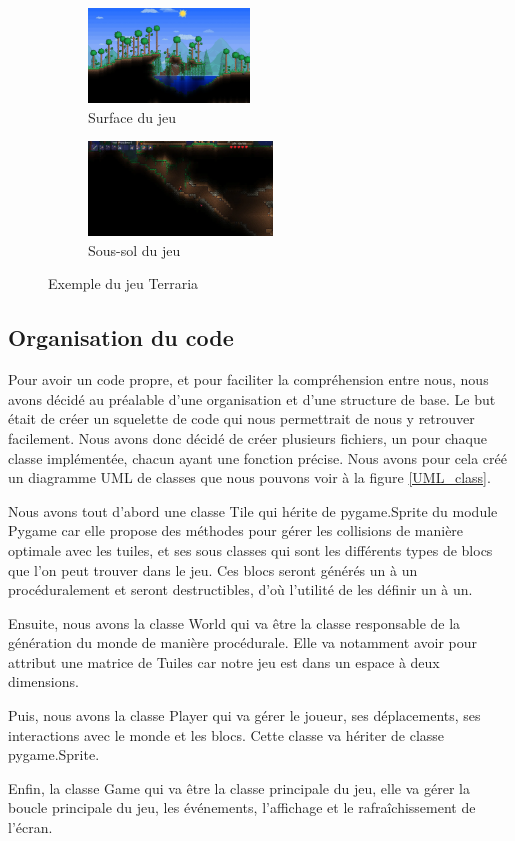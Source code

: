 \documentclass[12pt]{article}
\begin{document}
\begin{figure}[!h]
  \centering
  \begin{subfigure}[b]{0.4\textwidth}
    \centering
    \includegraphics[height=95px]{assets/terraria_forest_biome.jpg}
    \caption{Surface du jeu}
    \label{surface}
  \end{subfigure}
  \hspace{1cm}
  \begin{subfigure}[b]{0.4\textwidth}
    \centering
    \includegraphics[height=95px]{assets/terraria_cavern.png}
    \caption{Sous-sol du jeu}
    \label{cavern}
  \end{subfigure}
  \caption{Exemple du jeu Terraria}
  \label{ImageJeu}
\end{figure}
\vspace{1cm}
\subsection{Organisation du code}

Pour avoir un code propre, et pour faciliter la compréhension entre nous, nous avons décidé au préalable d'une organisation et d'une structure de base. Le but était de créer un squelette de code qui nous permettrait de nous y retrouver facilement. Nous avons donc décidé de créer plusieurs fichiers, un pour chaque classe implémentée, chacun ayant une fonction précise. Nous avons pour cela créé un diagramme UML de classes que nous pouvons voir à la figure \ref{UML_class}.\par
Nous avons tout d'abord une classe Tile qui hérite de pygame.Sprite du module Pygame car elle propose des méthodes pour gérer les collisions de manière optimale avec les tuiles, et ses sous classes qui sont les différents types de blocs que l'on peut trouver dans le jeu. Ces blocs seront générés un à un procéduralement et seront destructibles, d'où l'utilité de les définir un à un.\par
Ensuite, nous avons la classe World qui va être la classe responsable de la génération du monde de manière procédurale. Elle va notamment avoir pour attribut une matrice de Tuiles car notre jeu est dans un espace à deux dimensions.\par
Puis, nous avons la classe Player qui va gérer le joueur, ses déplacements, ses interactions avec le monde et les blocs. Cette classe va hériter de classe pygame.Sprite.\par
Enfin, la classe Game qui va être la classe principale du jeu, elle va gérer la boucle principale du jeu, les événements, l'affichage et le rafraîchissement de l'écran.\par
\end{document}
